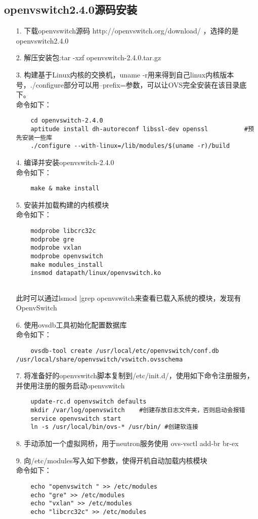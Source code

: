 \documentclass[a4paper,left=1.5cm,right=1.5cm,11pt]{article}
\begin{document}
\subsection{openvswitch2.4.0源码安装}
\begin{itemize}
    \item[1.]下载openvswitch源码 http://openvswitch.org/download/ ，选择的是openvswitch2.4.0
	\item[2.]解压安装包:tar -xzf openvswitch-2.4.0.tar.gz
	\item[3.]构建基于Linux内核的交换机，uname -r用来得到自己linux内核版本号，./configure部分可以用--prefix=参数，可以让OVS完全安装在该目录底下。\\
	命令如下：
	\begin{lstlisting}
	cd openvswitch-2.4.0
	aptitude install dh-autoreconf libssl-dev openssl          #预先安装一些库
	./configure --with-linux=/lib/modules/$(uname -r)/build
	\end{lstlisting}
	\item[4.]编译并安装openvswitch-2.4.0\\
	命令如下：
	\begin{lstlisting}
	make & make install
	\end{lstlisting}
	\item[5.]安装并加载构建的内核模块\\
	命令如下：
	\begin{lstlisting}
	modprobe libcrc32c
	modprobe gre
	modprobe vxlan
	modprobe openvswitch
	make modules_install
	insmod datapath/linux/openvswitch.ko
	
    \end{lstlisting}
    此时可以通过lsmod |grep openvswitch来查看已载入系统的模块，发现有OpenvSwitch
	\item[6.]使用ovsdb工具初始化配置数据库\\
	命令如下：
	\begin{lstlisting}
	ovsdb-tool create /usr/local/etc/openvswitch/conf.db /usr/local/share/openvswitch/vswitch.ovsschema
    \end{lstlisting}
	\item[7.]将准备好的openvswitch脚本复制到/etc/init.d/，使用如下命令注册服务，并使用注册的服务启动openvswitch
	\begin{lstlisting}
	update-rc.d openvswitch defaults
	mkdir /var/log/openvswitch    #创建存放日志文件夹，否则启动会报错
	service openvswitch start 
	ln -s /usr/local/bin/ovs-* /usr/bin/ #创建软连接
	\end{lstlisting}
	\item[8.]手动添加一个虚拟网桥，用于neutron服务使用
	ovs-vsctl add-br br-ex
	\item[9.]向/etc/modules写入如下参数，使得开机自动加载内核模块\\
	命令如下：
	\begin{lstlisting}
	echo "openvswitch " >> /etc/modules
	echo "gre" >> /etc/modules
	echo "vxlan" >> /etc/modules
	echo "libcrc32c" >> /etc/modules
	\end{lstlisting}
\end{itemize}
\end{document}
